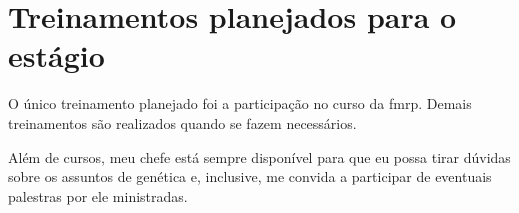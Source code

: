 

%
%
%

\section{Treinamentos planejados para o estágio}

O único treinamento planejado foi a participação no curso da \gls{fmrp}. Demais treinamentos são realizados quando se fazem necessários.

Além de cursos, meu chefe está sempre disponível para que eu possa tirar dúvidas sobre os assuntos de genética e, inclusive, me convida
a participar de eventuais palestras por ele ministradas.

